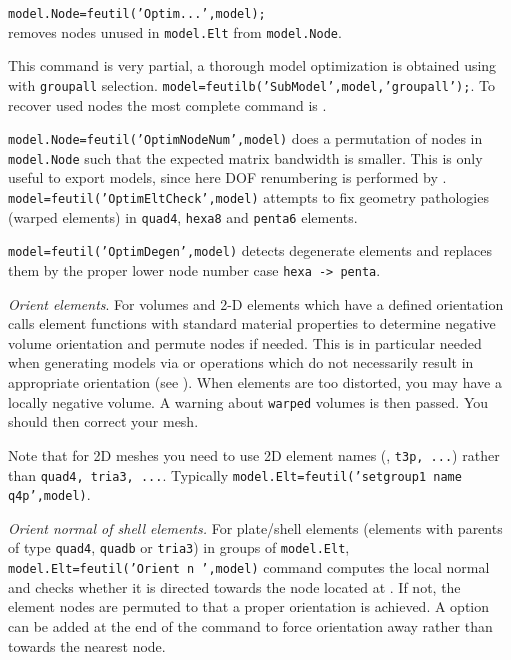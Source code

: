 {\tt model.Node=feutil('Optim...',model);}\\
 removes nodes unused in {\tt model.Elt} from {\tt model.Node}.\\
\begin{SDT}
This command is very partial, a thorough model optimization is obtained using  with {\tt groupall} selection. {\tt model=feutilb('SubModel',model,'groupall');}. 
To recover used nodes the most complete command is .
\end{SDT}

{\tt model.Node=feutil('OptimNodeNum',model)} does a permutation of nodes in {\tt model.Node} such that the expected matrix bandwidth is smaller. This is only useful to export models, since here DOF renumbering is performed by \femk.\\
{\tt model=feutil('OptimEltCheck',model)} attempts to fix geometry pathologies (warped elements) in {\tt quad4}, {\tt hexa8} and {\tt penta6} elements.

{\tt model=feutil('OptimDegen',model)} detects degenerate elements and replaces them by the proper lower node number case {\tt hexa -> penta}. 



{\sl Orient elements}.  For volumes and 2-D elements which have a defined orientation  calls element functions with standard material properties to determine negative volume orientation and permute nodes if needed. This is in particular needed when generating models via  or  operations which do not necessarily result in appropriate orientation (see \integrules). When elements are too distorted, you may have a locally negative volume. A warning about {\tt warped} volumes is then passed. You should then correct your mesh. 

Note that for 2D meshes you need to use 2D element names (\qfourp, {\tt t3p, ...}) rather than {\tt quad4, tria3, ...}. Typically  {\tt model.Elt=feutil('setgroup1 name q4p',model)}.

{\sl Orient normal of shell elements.} For plate/shell elements (elements with parents of type {\tt quad4}, {\tt quadb} or {\tt tria3}) in groups  of {\tt model.Elt},  {\tt model.Elt=feutil('Orient  n ',model)} command computes the local normal and checks whether it is directed towards the node located at . If not, the element nodes are permuted to that a proper orientation is achieved. A  option can be added at the end of the command to force orientation away rather than towards the nearest node.

